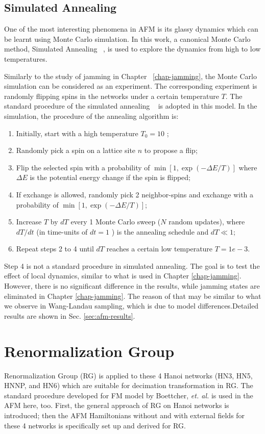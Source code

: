 \subsection{Simulated Annealing}
One of the most interesting phenomena in AFM is its glassy dynamics which can be learnt using Monte Carlo simulation. In this work, a canonical Monte Carlo method, Simulated Annealing ~\cite{SA}, is used to explore the dynamics from high to low temperatures. 

Similarly to the study of jamming in Chapter ~\ref{chap-jamming}, the Monte Carlo simulation can be considered as an experiment. The corresponding experiment is randomly flipping spins in the networks under a certain temperature $T$.  The standard procedure of the simulated annealing ~\cite{Vcerny1985} is adopted in this model. In the simulation, the procedure of the annealing algorithm is: 
\begin{enumerate}
\item Initially, start with a high temperature $T_{0}=10$ ; 
\item Randomly pick a spin on a lattice site $n$ to propose a flip; 
\item Flip the selected spin with a probability of $\min\left[1, \exp(-\Delta E /T)\right]$ 
where $\Delta E$ is the potential energy change if the spin is flipped; 
\item If exchange is allowed, randomly pick 2 neighbor-spins and exchange with a probability of $\min\left[1, \exp(-\Delta E /T)\right]$; 
\item Increase $T$ by $dT$ every 1 Monte Carlo sweep ($N$ random
updates), where $dT/dt$ (in time-units of $dt=1$ ) is the annealing
schedule and $dT\ll1$; 
\item Repeat steps 2 to 4 until $dT$ reaches a certain low temperature $T=1e-3$. 
\end{enumerate}

Step 4 is not a standard procedure in simulated annealing. The goal is to test the effect of local dynamics, similar to what is used in Chapter \ref{chap-jamming}. However, there is no significant difference in the results, while jamming states are eliminated in Chapter \ref{chap-jamming}. The reason of that may be similar to what we observe in Wang-Landau sampling, which is due to model differences.Detailed results are shown in Sec. \ref{sec:afm-results}.



\section{Renormalization Group}
\label{sec:afm-rg}
Renormalization Group (RG) is applied to these 4 Hanoi networks (HN3, HN5, HNNP, and HN6) which are suitable for decimation transformation in RG. The standard procedure developed for FM model by Boettcher, {\it et. al.} \cite{Boettcher2011HNNP, boettcher2015classification} is used in the AFM here, too. First, the general approach of RG on Hanoi networks is introduced; then the AFM Hamiltonians without and with external fields for these 4 networks is specifically set up and derived for RG.


